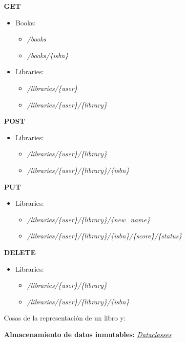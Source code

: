 \textbf{GET}
\begin{itemize}
    \item Books:
    \begin{itemize}
        \item \textit{/books}
        \item \textit{/books/\{isbn\}}
    \end{itemize}
    \item Libraries:
    \begin{itemize}
        \item \textit{/libraries/\{user\}}
        \item \textit{/libraries/\{user\}/\{library\}}
    \end{itemize}
\end{itemize}

\textbf{POST}
\begin{itemize}
    \item Libraries:
    \begin{itemize}
        \item \textit{/libraries/\{user\}/\{library\}}
        \item \textit{/libraries/\{user\}/\{library\}/\{isbn\}}
    \end{itemize}
\end{itemize}

\textbf{PUT}
\begin{itemize}
    \item Libraries:
    \begin{itemize}
        \item \textit{/libraries/\{user\}/\{library\}/\{new\_name\}}
        \item \textit{/libraries/\{user\}/\{library\}/\{isbn\}/\{score\}/\{status\}}
    \end{itemize}
\end{itemize}

\textbf{DELETE}
\begin{itemize}
    \item Libraries:
    \begin{itemize}
        \item \textit{/libraries/\{user\}/\{library\}}
        \item \textit{/libraries/\{user\}/\{library\}/\{isbn\}}
    \end{itemize}
\end{itemize}

Cosas de la representación de un libro y:

\textbf{Almacenamiento de datos inmutables:} \href{https://docs.python.org/3/library/dataclasses.html}{\textit{Dataclasses}}

